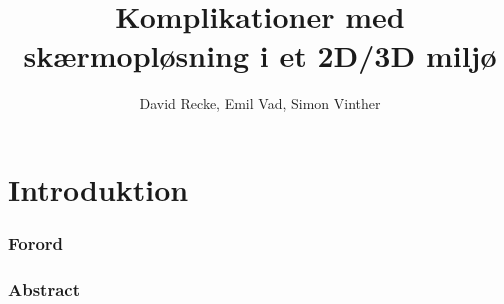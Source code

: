 \documentclass[twoside]{report}
\author{David Recke, Emil Vad, Simon Vinther}
\title{Komplikationer med skærmopløsning i et 2D/3D miljø}
\begin{document}
	\maketitle
	\tableofcontents
		
	\chapter{Introduktion}
		\subsection{Forord}
		

	\subsection{Abstract}
		

	\clearpage


	\appendix
\end{document}
